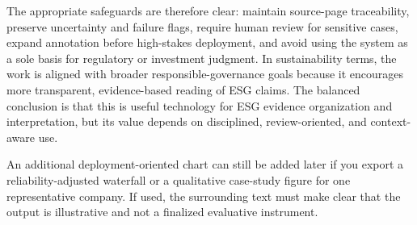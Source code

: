 The appropriate safeguards are therefore clear: maintain source-page traceability, preserve uncertainty and failure flags, require human review for sensitive cases, expand annotation before high-stakes deployment, and avoid using the system as a sole basis for regulatory or investment judgment. In sustainability terms, the work is aligned with broader responsible-governance goals because it encourages more transparent, evidence-based reading of ESG claims. The balanced conclusion is that this is useful technology for ESG evidence organization and interpretation, but its value depends on disciplined, review-oriented, and context-aware use.

An additional deployment-oriented chart can still be added later if you export a reliability-adjusted waterfall or a qualitative case-study figure for one representative company. If used, the surrounding text must make clear that the output is illustrative and not a finalized evaluative instrument.
